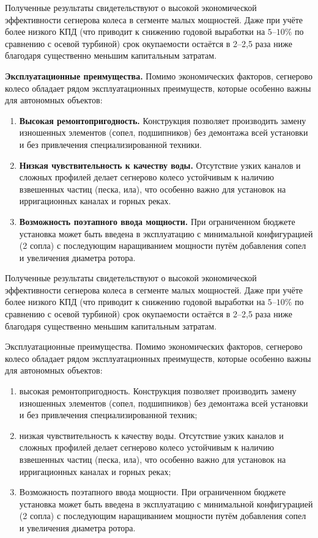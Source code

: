 	Полученные результаты свидетельствуют о высокой экономической эффективности
сегнерова колеса в сегменте малых мощностей. Даже при учёте более низкого КПД (что
приводит к снижению годовой выработки на $5$--$10\%$ по сравнению с осевой турбиной) срок
окупаемости остаётся в 2--2,5 раза ниже благодаря существенно меньшим капитальным
затратам.
	
	\textbf{Эксплуатационные преимущества.} Помимо экономических факторов, сегнерово колесо обладает рядом эксплуатационных преимуществ, которые особенно важны для автономных объектов:
\begin{enumerate}
    \renewcommand{\labelenumi}{\textbf{\arabic{enumi}.}}
    \item \textbf{Высокая ремонтопригодность.} Конструкция позволяет производить замену
изношенных элементов (сопел, подшипников) без демонтажа всей установки и без
привлечения специализированной техники.
    \item \textbf{Низкая чувствительность к качеству воды.} Отсутствие узких каналов и сложных
профилей делает сегнерово колесо устойчивым к наличию взвешенных частиц (песка,
ила), что особенно важно для установок на ирригационных каналах и горных реках.
    \item \textbf{Возможность поэтапного ввода мощности.} При ограниченном бюджете установка
может быть введена в эксплуатацию с минимальной конфигурацией (2 сопла) с
последующим наращиванием мощности путём добавления сопел и увеличения
диаметра ротора.
\end{enumerate}

Полученные результаты свидетельствуют о высокой экономической эффективности
сегнерова колеса в сегменте малых мощностей. Даже при учёте более низкого КПД (что
приводит к снижению годовой выработки на $5$--$10\%$ по сравнению с осевой турбиной) срок
окупаемости остаётся в 2--2,5 раза ниже благодаря существенно меньшим капитальным
затратам.
	
	Эксплуатационные преимущества. Помимо экономических факторов, сегнерово колесо обладает рядом эксплуатационных преимуществ, которые особенно важны для автономных объектов:
\begin{enumerate}
    \renewcommand{\labelenumi}{\arabic{enumi})}
    \item высокая ремонтопригодность. Конструкция позволяет производить замену
изношенных элементов (сопел, подшипников) без демонтажа всей установки и без
привлечения специализированной техник;
    \item низкая чувствительность к качеству воды. Отсутствие узких каналов и сложных
профилей делает сегнерово колесо устойчивым к наличию взвешенных частиц (песка,
ила), что особенно важно для установок на ирригационных каналах и горных реках;
    \item Возможность поэтапного ввода мощности. При ограниченном бюджете установка
может быть введена в эксплуатацию с минимальной конфигурацией (2 сопла) с
последующим наращиванием мощности путём добавления сопел и увеличения
диаметра ротора.
\end{enumerate}

